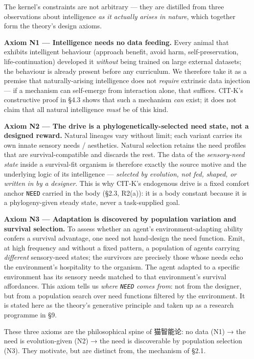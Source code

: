 \documentclass[11pt]{article}
\begin{document}
The kernel's constraints are not arbitrary — they are distilled from three observations about intelligence \emph{as it actually arises in nature}, which together form the theory's design axioms.

\textbf{Axiom N1 — Intelligence needs no data feeding.} Every animal that exhibits intelligent behaviour (approach benefit, avoid harm, self-preservation, life-continuation) developed it \emph{without} being trained on large external datasets; the behaviour is already present before any curriculum. We therefore take it as a premise that naturally-arising intelligence does not \emph{require} extrinsic data injection — if a mechanism can self-emerge from interaction alone, that suffices. CIT-K's constructive proof in §4.3 shows that such a mechanism \emph{can} exist; it does not claim that all natural intelligence \emph{must} be of this kind.

\textbf{Axiom N2 — The drive is a phylogenetically-selected need state, not a designed reward.} Natural lineages vary without limit; each variant carries its own innate sensory needs / aesthetics. Natural selection retains the need profiles that are survival-compatible and discards the rest. The data of the \emph{sensory-need state} inside a survival-fit organism is therefore exactly the source motive and the underlying logic of its intelligence — \emph{selected by evolution, not fed, shaped, or written in by a designer}. This is why CIT-K's endogenous drive is a fixed comfort anchor \texttt{NEED} carried in the body (§2.3, R2(a)): it is a body constant because it is a phylogeny-given steady state, never a task-supplied goal.

\textbf{Axiom N3 — Adaptation is discovered by population variation and survival selection.} To assess whether an agent's environment-adapting ability confers a survival advantage, one need not hand-design the need function. Emit, at high frequency and without a fixed pattern, a population of agents carrying \emph{different} sensory-need states; the survivors are precisely those whose needs echo the environment's hospitality to the organism. The agent adapted to a specific environment has its sensory needs matched to that environment's survival affordances. This axiom tells us \emph{where \texttt{NEED} comes from}: not from the designer, but from a population search over need functions filtered by the environment. It is stated here as the theory's generative principle and taken up as a research programme in §9.

These three axioms are the philosophical spine of 猫智能论: no data (N1) → the need is evolution-given (N2) → the need is discoverable by population selection (N3). They motivate, but are distinct from, the mechanism of §2.1.
\end{document}
